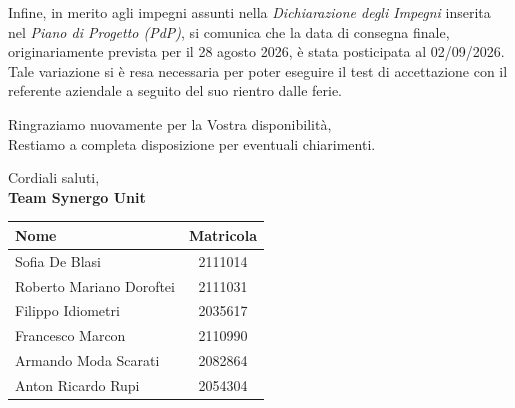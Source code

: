 \documentclass[11pt, a4paper]{article}
\begin{document}
    \vspace{0.3cm}
    Infine, in merito agli impegni assunti nella \textit{Dichiarazione degli Impegni} inserita nel \textit{Piano di Progetto (PdP)}, si comunica che la data di consegna finale, originariamente prevista per il 28 agosto 2026, è stata posticipata al 02/09/2026. Tale variazione si è resa necessaria per poter eseguire il test di accettazione con il referente aziendale a seguito del suo rientro dalle ferie.

    \vspace{0.5cm}
    Ringraziamo nuovamente per la Vostra disponibilità,\\
    Restiamo a completa disposizione per eventuali chiarimenti.
    
    \vspace{0.5cm}
    Cordiali saluti,\\
    \textbf{Team Synergo Unit}

    \vspace{0.6cm}

    \begin{center}
        \begin{tabular}{|l|c|}
            \hline
            \textbf{Nome} & \textbf{Matricola} \\
            \hline
            Sofia De Blasi & 2111014 \\
            Roberto Mariano Doroftei & 2111031 \\
            Filippo Idiometri & 2035617 \\
            Francesco Marcon & 2110990 \\
            Armando Moda Scarati & 2082864 \\
            Anton Ricardo Rupi & 2054304 \\
            \hline
        \end{tabular}
    \end{center}
\end{document}
